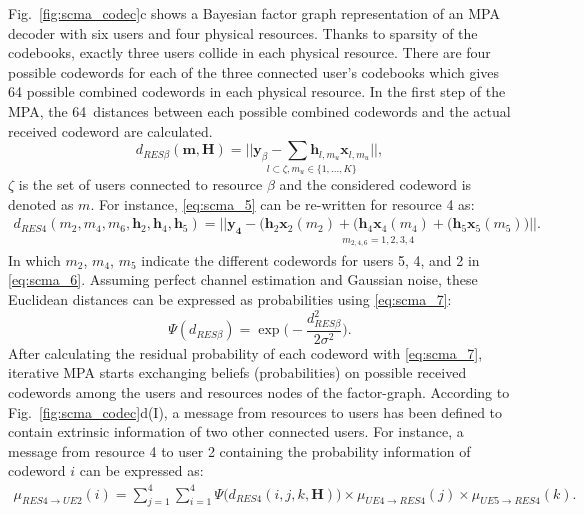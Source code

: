 Fig.~\ref{fig:scma_codec}c shows a Bayesian factor graph representation of an
MPA decoder with six users and four physical resources. Thanks to sparsity of
the codebooks, exactly three users collide in each physical resource. There are
four possible codewords for each of the three connected user's codebooks which
gives 64 possible combined codewords in each physical resource. In the first
step of the MPA, the 64~distances between each possible combined codewords and
the actual received codeword are calculated.
\begin{equation}
  \label{eq:scma_5}
  d_{RES  \beta}(\bm{m}, \bm{H}) =
  \underset{l \subset \zeta, m_u\in\{1,...,K\}}{||\bm{y}_\beta -
  \sum \bm{h}_{l,m_u} \bm{x}_{l,m_u} ||},
\end{equation}
$\zeta$ is the set of users connected to resource $\beta$ and the
considered codeword is denoted as $m$. For instance, \eqref{eq:scma_5} can be
re-written for resource 4 as:
\begin{equation}
  \label{eq:scma_6}
  \begin{split}
  d_{RES 4}(m_2,m_4,m_6,\bm{h}_2, \bm{h}_4, \bm{h}_5) =
  \underset{m_{2,4,6}=1,2,3,4}{|| \bm{y_4} - \Big(\bm{h}_2\bm{x}_2(m_2) +
  (\bm{h}_4\bm{x}_4(m_4) + (\bm{h}_5\bm{x}_5(m_5) \Big) ||}.
  \end{split}
\end{equation}
In which $m_2$, $m_4$, $m_5$ indicate the different codewords for users 5, 4,
and 2 in \eqref{eq:scma_6}. Assuming perfect channel estimation and Gaussian
noise, these Euclidean distances can be expressed as probabilities using
\eqref{eq:scma_7}:
\begin{equation}
  \label{eq:scma_7}
  \Psi(d_{RES \beta}) = \exp \Bigg(-\frac{d_{RES \beta}^2}{2\sigma^2} \Bigg).
\end{equation}
After calculating the residual probability of each codeword with
\eqref{eq:scma_7}, iterative MPA starts exchanging beliefs (probabilities) on
possible received codewords among the users and resources nodes of the
factor-graph. According to Fig.~\ref{fig:scma_codec}d(I), a message from
resources to users has been defined to contain extrinsic information of two
other connected users. For instance, a message from resource 4 to user 2
containing the probability information of codeword $i$ can be expressed as:
\begin{equation}
  \label{eq:scma_8}
  \begin{split}
  \mu_{RES4 \rightarrow UE2}(i) = \sum\limits_{j=1}^4 \sum\limits_{i=1}^4 \Psi
  \Big(d_{RES4}(i,j,k,\bm{H}) \Big)
  \times \mu_{UE4 \rightarrow RES4}(j) \times \mu_{UE5 \rightarrow RES4}(k).
  \end{split}
\end{equation}
